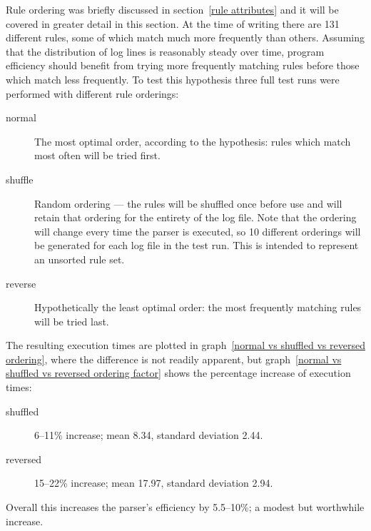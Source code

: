 \documentclass[a4paper,12pt,draft]{article}
\begin{document}
Rule ordering was briefly discussed in section~\ref{rule attributes} and
it will be covered in greater detail in this section.  At the time of
writing there are 131 different rules, some of which match much more
frequently than others.  Assuming that the distribution of log lines is
reasonably steady over time, program efficiency should benefit from trying
more frequently matching rules before those which match less frequently.
To test this hypothesis three full test runs were performed with different
rule orderings:

\begin{description}

    \item [normal]  The most optimal order, according to the hypothesis:
        rules which match most often will be tried first.

    \item [shuffle] Random ordering --- the rules will be shuffled once
        before use and will retain that ordering for the entirety of the
        log file.  Note that the ordering will change every time the parser
        is executed, so 10 different orderings will be generated for each
        log file in the test run.  This is intended to represent an
        unsorted rule set.

    \item [reverse] Hypothetically the least optimal order: the most
        frequently matching rules will be tried last.

\end{description}


The resulting execution times are plotted in graph~\ref{normal vs shuffled
vs reversed ordering}, where the difference is not readily apparent, but
graph~\ref{normal vs shuffled vs reversed ordering factor} shows the
percentage increase of execution times:

\begin{description}

    \item [shuffled] 6--11\% increase; mean 8.34, standard deviation 2.44.

    \item [reversed] 15--22\% increase; mean 17.97, standard deviation
        2.94.

\end{description}

Overall this increases the parser's efficiency by 5.5--10\%; a modest but
worthwhile increase.
\end{document}
